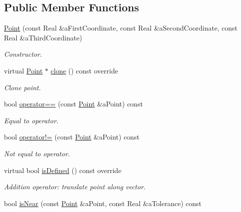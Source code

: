 \subsection*{Public Member Functions}
\begin{DoxyCompactItemize}
\item 
\hyperlink{classlibrary_1_1math_1_1geom_1_1d3_1_1objects_1_1_point_a617e690ab6091af3de729cee337e309e}{Point} (const Real \&a\+First\+Coordinate, const Real \&a\+Second\+Coordinate, const Real \&a\+Third\+Coordinate)
\begin{DoxyCompactList}\small\item\em Constructor. \end{DoxyCompactList}\item 
virtual \hyperlink{classlibrary_1_1math_1_1geom_1_1d3_1_1objects_1_1_point}{Point} $\ast$ \hyperlink{classlibrary_1_1math_1_1geom_1_1d3_1_1objects_1_1_point_a32aa1e233c6ac5341605961f6bf0f210}{clone} () const override
\begin{DoxyCompactList}\small\item\em Clone point. \end{DoxyCompactList}\item 
bool \hyperlink{classlibrary_1_1math_1_1geom_1_1d3_1_1objects_1_1_point_a0e89a102cf4e3f77b26e0bf234a69075}{operator==} (const \hyperlink{classlibrary_1_1math_1_1geom_1_1d3_1_1objects_1_1_point}{Point} \&a\+Point) const
\begin{DoxyCompactList}\small\item\em Equal to operator. \end{DoxyCompactList}\item 
bool \hyperlink{classlibrary_1_1math_1_1geom_1_1d3_1_1objects_1_1_point_abf144133b487834091866a71116ce31a}{operator!=} (const \hyperlink{classlibrary_1_1math_1_1geom_1_1d3_1_1objects_1_1_point}{Point} \&a\+Point) const
\begin{DoxyCompactList}\small\item\em Not equal to operator. \end{DoxyCompactList}\item 
virtual bool \hyperlink{classlibrary_1_1math_1_1geom_1_1d3_1_1objects_1_1_point_a9874289efeb457ada4b32d7eb1e012f6}{is\+Defined} () const override
\begin{DoxyCompactList}\small\item\em Addition operator\+: translate point along vector. \end{DoxyCompactList}\item 
bool \hyperlink{classlibrary_1_1math_1_1geom_1_1d3_1_1objects_1_1_point_a0bcdce172502509f9b9d4e5b3fc75a69}{is\+Near} (const \hyperlink{classlibrary_1_1math_1_1geom_1_1d3_1_1objects_1_1_point}{Point} \&a\+Point, const Real \&a\+Tolerance) const

\end{DoxyCompactItemize}
